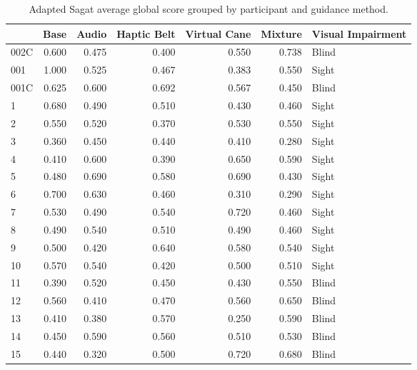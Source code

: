 
\begin{table}[!htb]
\centering
\caption{Adapted Sagat average global score grouped by participant and guidance method.}
\label{tab:sagat_average}
\begin{tabular}{lrrrrrl}
\toprule
{} &  Base &  Audio &  Haptic Belt &  Virtual Cane &  Mixture & Visual Impairment \\
\midrule
002C & 0.600 &  0.475 &        0.400 &         0.550 &    0.738 &             Blind \\
001  & 1.000 &  0.525 &        0.467 &         0.383 &    0.550 &             Sight \\
001C & 0.625 &  0.600 &        0.692 &         0.567 &    0.450 &             Blind \\
1    & 0.680 &  0.490 &        0.510 &         0.430 &    0.460 &             Sight \\
2    & 0.550 &  0.520 &        0.370 &         0.530 &    0.550 &             Sight \\
3    & 0.360 &  0.450 &        0.440 &         0.410 &    0.280 &             Sight \\
4    & 0.410 &  0.600 &        0.390 &         0.650 &    0.590 &             Sight \\
5    & 0.480 &  0.690 &        0.580 &         0.690 &    0.430 &             Sight \\
6    & 0.700 &  0.630 &        0.460 &         0.310 &    0.290 &             Sight \\
7    & 0.530 &  0.490 &        0.540 &         0.720 &    0.460 &             Sight \\
8    & 0.490 &  0.540 &        0.510 &         0.490 &    0.460 &             Sight \\
9    & 0.500 &  0.420 &        0.640 &         0.580 &    0.540 &             Sight \\
10   & 0.570 &  0.540 &        0.420 &         0.500 &    0.510 &             Sight \\
11   & 0.390 &  0.520 &        0.450 &         0.430 &    0.550 &             Blind \\
12   & 0.560 &  0.410 &        0.470 &         0.560 &    0.650 &             Blind \\
13   & 0.410 &  0.380 &        0.570 &         0.250 &    0.590 &             Blind \\
14   & 0.450 &  0.590 &        0.560 &         0.510 &    0.530 &             Blind \\
15   & 0.440 &  0.320 &        0.500 &         0.720 &    0.680 &             Blind \\

\end{tabular}
\end{table}
